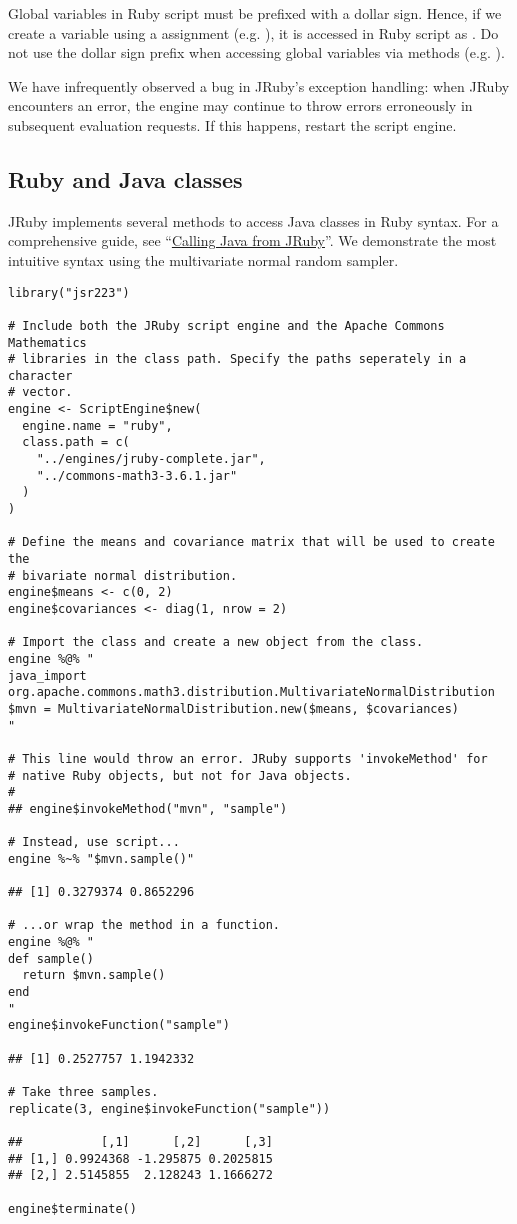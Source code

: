 
 Global variables in Ruby script must be prefixed with a dollar sign. Hence, if we create a variable  using a  assignment (e.g. ), it is accessed in Ruby script as . Do not use the dollar sign prefix when accessing global variables via  methods (e.g. ).

 We have infrequently observed a bug in JRuby's exception handling: when JRuby encounters an error, the engine may continue to throw errors erroneously in subsequent evaluation requests. If this happens, restart the script engine.

\subsection{Ruby and Java classes}

JRuby implements several methods to access Java classes in Ruby syntax. For a comprehensive guide, see “\href{https://github.com/jruby/jruby/wiki/CallingJavaFromJRuby}{Calling Java from JRuby}”. We demonstrate the most intuitive syntax using the multivariate normal random sampler.

\begin{verbatim}
library("jsr223")

# Include both the JRuby script engine and the Apache Commons Mathematics
# libraries in the class path. Specify the paths seperately in a character
# vector.
engine <- ScriptEngine$new(
  engine.name = "ruby", 
  class.path = c(
    "../engines/jruby-complete.jar",
    "../commons-math3-3.6.1.jar"
  )
)

# Define the means and covariance matrix that will be used to create the 
# bivariate normal distribution.
engine$means <- c(0, 2)
engine$covariances <- diag(1, nrow = 2)

# Import the class and create a new object from the class.
engine %@% "
java_import org.apache.commons.math3.distribution.MultivariateNormalDistribution
$mvn = MultivariateNormalDistribution.new($means, $covariances)
"

# This line would throw an error. JRuby supports 'invokeMethod' for
# native Ruby objects, but not for Java objects.
# 
## engine$invokeMethod("mvn", "sample")

# Instead, use script...
engine %~% "$mvn.sample()"

## [1] 0.3279374 0.8652296

# ...or wrap the method in a function.
engine %@% "
def sample()
  return $mvn.sample()
end
"
engine$invokeFunction("sample")

## [1] 0.2527757 1.1942332

# Take three samples.
replicate(3, engine$invokeFunction("sample"))

##           [,1]      [,2]      [,3]
## [1,] 0.9924368 -1.295875 0.2025815
## [2,] 2.5145855  2.128243 1.1666272

engine$terminate()
\end{verbatim}

